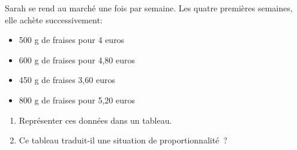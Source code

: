 \documentclass[exercice]{thedocument}%
\begin{document}
%
Sarah se rend au marché une fois par semaine. Les quatre premières semaines,
elle achète successivement:
\begin{itemize}
    \item 500 g de fraises pour 4 euros
    \item 600 g de fraises pour 4,80 euros
    \item 450 g de fraises 3,60 euros
    \item 800 g de fraises pour 5,20 euros
\end{itemize}
\begin{enumerate}
    \item Représenter ces données dans un tableau.
    \item Ce tableau traduit-il une situation de proportionnalité~?
\end{enumerate}
\end{document}

